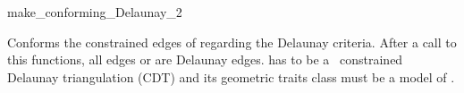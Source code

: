 \begin{ccRefFunction}{make_conforming_Delaunay_2}


{ Conforms the constrained edges of  regarding the Delaunay
  criteria. After a call to this functions, all edges or  are
  Delaunay edges.
  \ccPrecond {} has to be a \cgal\ constrained Delaunay
  triangulation (CDT) and its geometric traits class must be a model
  of .}

\end{ccRefFunction}

